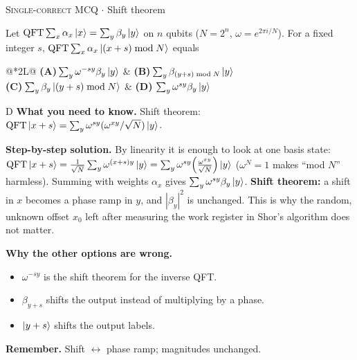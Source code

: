 \documentclass[11pt,a4paper]{article}
\newcommand{\optlabel}[1]{\textbf{(#1)}}
\newcommand{\correctlabel}[1]{\textcolor{okgreen}{\textbf{(#1)}\,\ding{51}}}
\newenvironment{qitem}[1]{\begin{list}{}{\setlength{\leftmargin}{3.3em}\setlength{\labelwidth}{3.1em}%
  \setlength{\labelsep}{0.2em}\setlength{\topsep}{3pt}\setlength{\parsep}{3pt}}\item[\textbf{Q.#1}\hfill]}{\end{list}}
\newcommand{\qsep}{\par\vspace{2pt}{\color{black!15}\hrule}\vspace{4pt}}
\newcommand{\qmeta}[2]{{\footnotesize\color{black!60}\textsc{#1} \;$\cdot$\; #2}\par}
\newcommand{\QFTop}{\mathrm{QFT}}
\begin{document}
\begin{qitem}{63}
\qmeta{Single-correct MCQ}{Shift theorem}
Let $\mathrm{QFT}\sum_x\alpha_x\ket{x} = \sum_y\beta_y\ket{y}$ on $n$ qubits ($N = 2^n$, $\omega = e^{2\pi i/N}$). For a fixed integer $s$,
$\mathrm{QFT}\sum_x\alpha_x\ket{(x + s) \bmod N}$ equals
\par\smallskip\noindent\begin{tabularx}{\linewidth}{@{}*{2}{L}@{}}
\optlabel{A}\,$\sum_y\omega^{-sy}\beta_y\ket{y}$ & \optlabel{B}\,$\sum_y\beta_{(y+s)\bmod N}\ket{y}$ \\[3pt]
\optlabel{C}\,$\sum_y\beta_y\ket{(y + s)\bmod N}$ & \correctlabel{D}\,$\sum_y\omega^{sy}\beta_y\ket{y}$
\end{tabularx}
\end{qitem}
\begin{solbox}{D}
\textbf{\color{brand}What you need to know.} Shift theorem: $\QFTop\ket{x + s} = \sum_y\omega^{sy}(\omega^{xy}/\sqrt N)\ket y$.

\textbf{\color{brand}Step-by-step solution.} By linearity it is enough to look at one basis state:
$\mathrm{QFT}\ket{x+s} = \frac{1}{\sqrt N}\sum_y\omega^{(x+s)y}\ket y = \sum_y\omega^{sy}\Big(\frac{\omega^{xy}}{\sqrt N}\Big)\ket y$
($\omega^{N} = 1$ makes ``mod $N$'' harmless). Summing with weights $\alpha_x$ gives $\sum_y\omega^{sy}\beta_y\ket y$.
\textbf{Shift theorem:} a shift in $x$ becomes a phase ramp in $y$, and $|\beta_y|^2$ is unchanged. This is why the random,
unknown offset $x_0$ left after measuring the work register in Shor's algorithm does not matter.

\textbf{\color{brand}Why the other options are wrong.}
\begin{itemize}[leftmargin=2.4em, itemsep=1pt, topsep=2pt]
\item[\textbf{(A)}] $\omega^{-sy}$ is the shift theorem for the inverse QFT.
\item[\textbf{(B)}] $\beta_{y+s}$ shifts the output instead of multiplying by a phase.
\item[\textbf{(C)}] $\ket{y+s}$ shifts the output labels.
\end{itemize}
\textbf{\color{brand}Remember.} Shift $\leftrightarrow$ phase ramp; magnitudes unchanged.
\end{solbox}
\qsep
\end{document}
